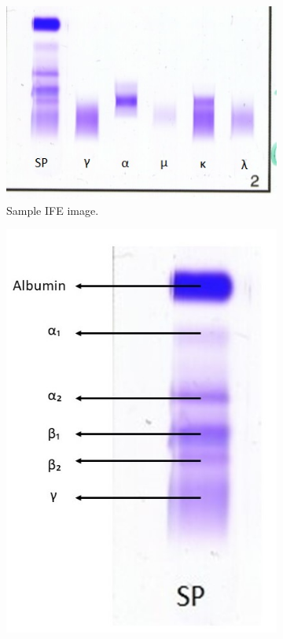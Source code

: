 \begin{figure}[H]
\centering

\begin{subfigure}[t]{0.50\textwidth}
\centering
\includegraphics[width=1\textwidth]{images/old imgs/IFE_names.jpg}
\caption{Sample IFE image.}
\label{IFE}
\end{subfigure}
\hfill
\begin{subfigure}[t]{0.40\textwidth}
\centering
\includegraphics[width=1\textwidth]{images/old imgs/sp_name.jpg}

\end{subfigure}
\end{figure}
